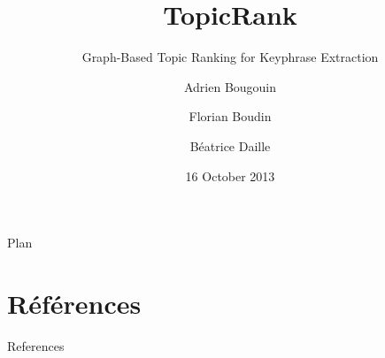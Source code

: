 \documentclass[14pt, xcolor={usenames, dvipsnames}]{beamer}
\title{TopicRank}
\subtitle{Graph-Based Topic Ranking for Keyphrase Extraction}
\author{Adrien Bougouin \and Florian Boudin \and Béatrice Daille}
\institute{Université de Nantes, LINA, France}
\date{16 October 2013}
\begin{document}
  \renewcommand*{\theenumii}{\alph{enumii}}
  \renewcommand*{\theenumiii}{\roman{enumiii}}

  \begin{frame}
    \titlepage
  \end{frame}
  \setcounter{framenumber}{0}

  
  
  
  \begin{frame}{Plan}
    \tableofcontents[section]
  \end{frame}
  
  
  
  
  \section*{Références}
    \begin{frame}[allowframebreaks]{References}
      \def\newblock{\hskip .11em plus .33em minus .07em}
      
      
    \end{frame}
\end{document}
